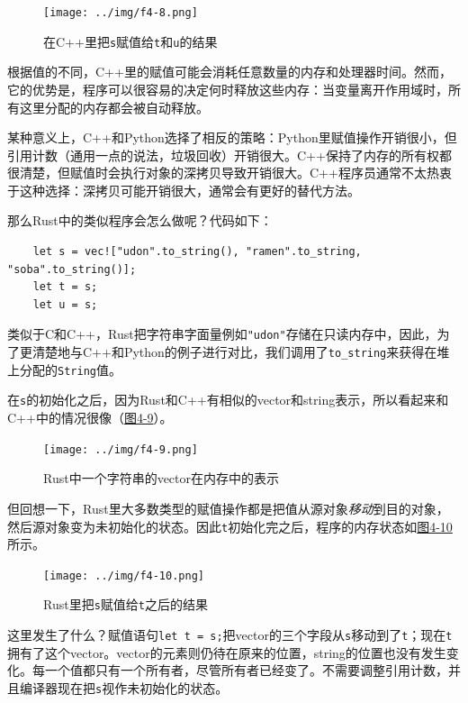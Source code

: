 \begin{figure}[htbp]
    \centering
    \texttt{[image: ../img/f4-8.png]}
    \caption{在C++里把\texttt{s}赋值给\texttt{t}和\texttt{u}的结果}
    \label{f4-8}
\end{figure}

根据值的不同，C++里的赋值可能会消耗任意数量的内存和处理器时间。然而，它的优势是，程序可以很容易的决定何时释放这些内存：当变量离开作用域时，所有这里分配的内存都会被自动释放。

某种意义上，C++和Python选择了相反的策略：Python里赋值操作开销很小，但引用计数（通用一点的说法，垃圾回收）开销很大。C++保持了内存的所有权都很清楚，但赋值时会执行对象的深拷贝导致开销很大。C++程序员通常不太热衷于这种选择：深拷贝可能开销很大，通常会有更好的替代方法。

那么Rust中的类似程序会怎么做呢？代码如下：
\begin{verbatim}
    let s = vec!["udon".to_string(), "ramen".to_string, "soba".to_string()];
    let t = s;
    let u = s;
\end{verbatim}

类似于C和C++，Rust把字符串字面量例如\texttt{"udon"}存储在只读内存中，因此，为了更清楚地与C++和Python的例子进行对比，我们调用了\texttt{to\_string}来获得在堆上分配的\texttt{String}值。

在\texttt{s}的初始化之后，因为Rust和C++有相似的vector和string表示，所以看起来和C++中的情况很像（\hyperref[f4-9]{图4-9}）。

\begin{figure}[htbp]
    \centering
    \texttt{[image: ../img/f4-9.png]}
    \caption{Rust中一个字符串的vector在内存中的表示}
    \label{f4-9}
\end{figure}

但回想一下，Rust里大多数类型的赋值操作都是把值从源对象\emph{移动}到目的对象，然后源对象变为未初始化的状态。因此\texttt{t}初始化完之后，程序的内存状态如\hyperref[f4-10]{图4-10}所示。

\begin{figure}[htbp]
    \centering
    \texttt{[image: ../img/f4-10.png]}
    \caption{Rust里把\texttt{s}赋值给\texttt{t}之后的结果}
    \label{f4-10}
\end{figure}

这里发生了什么？赋值语句\texttt{let t = s;}把vector的三个字段从\texttt{s}移动到了\texttt{t}；现在\texttt{t}拥有了这个vector。vector的元素则仍待在原来的位置，string的位置也没有发生变化。每一个值都只有一个所有者，尽管所有者已经变了。不需要调整引用计数，并且编译器现在把\texttt{s}视作未初始化的状态。

